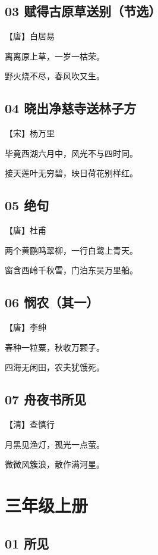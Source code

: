 \documentclass[a6paper, 12pt]{article}
\begin{document}
\subsection*{03 赋得古原草送别（节选）}

【唐】白居易

离离原上草，一岁一枯荣。

野火烧不尽，春风吹又生。

\subsection*{04 晓出净慈寺送林子方}

【宋】杨万里

毕竟西湖六月中，风光不与四时同。

接天莲叶无穷碧，映日荷花别样红。

\subsection*{05 绝句}

【唐】杜甫

两个黄鹂鸣翠柳，一行白鹭上青天。

窗含西岭千秋雪，门泊东吴万里船。

\subsection*{06 悯农（其一）}

【唐】李绅

春种一粒粟，秋收万颗子。

四海无闲田，农夫犹饿死。

\subsection*{07 舟夜书所见}

【清】查慎行

月黑见渔灯，孤光一点萤。

微微风簇浪，散作满河星。

\newpage

\section*{三年级上册}

\subsection*{01 所见}
\end{document}
